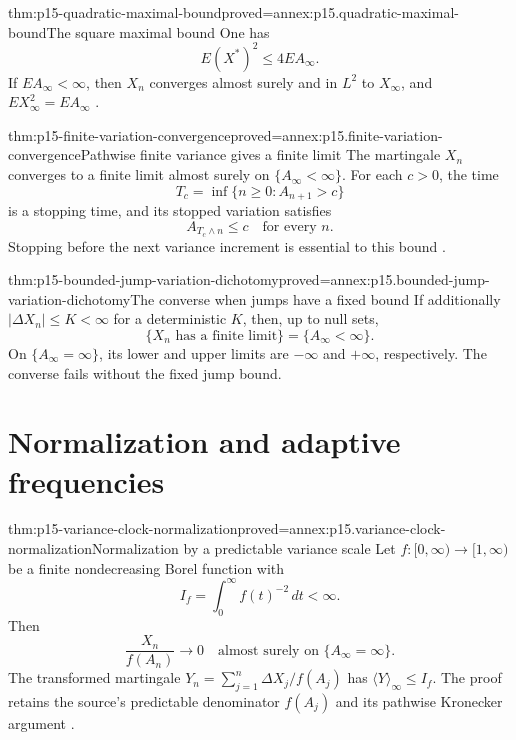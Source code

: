 \begin{hbtheorem}{thm:p15-quadratic-maximal-bound}{proved=annex:p15.quadratic-maximal-bound}{The square maximal bound}
One has
\[
                                  E(X^*)^2\leq4EA_\infty.
\]
If \(EA_\infty<\infty\), then \(X_n\) converges almost surely
and in \(L^2\) to \(X_\infty\), and
\(EX_\infty^2=EA_\infty\)
\cite[thm.~4.5.1]{DurrettPTEAuthor2019}.
\end{hbtheorem}

\begin{hbtheorem}{thm:p15-finite-variation-convergence}{proved=annex:p15.finite-variation-convergence}{Pathwise finite variance gives a finite limit}
The martingale \(X_n\) converges to a finite limit almost surely
on \(\{A_\infty<\infty\}\).
For each \(c>0\), the time
\[
                     T_c=\inf\{n\geq0:A_{n+1}>c\}
\]
is a stopping time, and its stopped variation satisfies
\[
                       A_{T_c\wedge n}\leq c\quad\text{for every }n.
\]
Stopping before the next variance increment is essential to this
bound \cite[thm.~4.5.2]{DurrettPTEAuthor2019}.
\end{hbtheorem}

\begin{hbtheorem}{thm:p15-bounded-jump-variation-dichotomy}{proved=annex:p15.bounded-jump-variation-dichotomy}{The converse when jumps have a fixed bound}
If additionally \(|\Delta X_n|\leq K<\infty\) for a deterministic
\(K\), then, up to null sets,
\[
 \{X_n\text{ has a finite limit}\}=\{A_\infty<\infty\}.
\]
On \(\{A_\infty=\infty\}\), its lower and upper limits are
\(-\infty\) and \(+\infty\), respectively.
The converse fails without the fixed jump bound.
\end{hbtheorem}

\section{Normalization and adaptive frequencies}
\label{sec:p15-variance-normalization}

\begin{hbtheorem}{thm:p15-variance-clock-normalization}{proved=annex:p15.variance-clock-normalization}{Normalization by a predictable variance scale}
Let \(f:[0,\infty)\to[1,\infty)\) be a finite nondecreasing
Borel function with
\[
                             I_f=\int_0^\infty f(t)^{-2}\,dt<\infty.
\]
Then
\[
                  \frac{X_n}{f(A_n)}\longrightarrow0
                                \quad\text{almost surely on }\{A_\infty=\infty\}.
\]
The transformed martingale
\(Y_n=\sum_{j=1}^n\Delta X_j/f(A_j)\) has
\(\langle Y\rangle_\infty\leq I_f\).
The proof retains the source's predictable denominator \(f(A_j)\)
and its pathwise Kronecker argument
\cite[thm.~4.5.3]{DurrettPTEAuthor2019}.
\end{hbtheorem}

